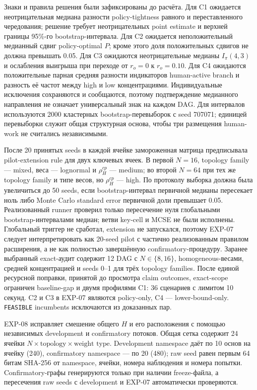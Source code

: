 Знаки и правила решения были зафиксированы до расчёта. Для C1 ожидается
неотрицательная медиана разности policy-tightness равного и переставленного
чередования; решение требует неотрицательных point estimate и верхней границы
95\%-го bootstrap-интервала. Для C2 ожидается неположительный медианный сдвиг
policy-optimal $P$; кроме этого доля положительных сдвигов не должна превышать
0.05. Для C3 ожидаются неотрицательные медианы $I_\pi(4,3)$ и ослабления
выигрыша при переходе от $r_o=0$ к $r_o=0.10$. Для C4 ожидаются положительные
парная средняя разности индикаторов human-active branch и разность её частот
между high и low концентрациями. Индивидуальные исключения сохраняются и
сообщаются, поэтому подтверждение медианного направления не означает
универсальный знак на каждом DAG. Для интервалов используются 2000 кластерных
bootstrap-перевыборок с seed 707071; единицей перевыборки служит общая
структурная основа, чтобы три размещения human-work не считались независимыми.

После 20 принятых seeds в каждой ячейке замороженная матрица предписывала
pilot-extension rule для двух ключевых ячеек. В первой $N=16$, topology
family --- mixed, веса --- lognormal и $\rho_H^{cp}$ --- medium; во второй
$N=64$ при тех же topology family и типе весов, но $\rho_H^{cp}$ --- high.
По протоколу выборка должна была увеличиться до 50 seeds, если
bootstrap-интервал первичной медианы пересекает ноль либо Monte Carlo standard
error первичной доли превышает 0.05. Реализованный runner проверил только
пересечение нуля глобальными bootstrap-интервалами медиан; ветви key-cell и
MCSE не были исполнены. Глобальный триггер не сработал, extension не запускался,
поэтому EXP-07 следует интерпретировать как 20-seed pilot с частично
реализованным правилом расширения, а не как полностью завершённую
confirmatory-процедуру. Заранее выбранный exact-аудит содержит 12 DAG с
$N\in\{8,16\}$, homogeneous-весами, средней концентрацией и seeds 0--1 для
трёх topology families. После единой ресурсной поправки, принятой до просмотра
claim outcomes, exact-scope ограничен baseline-gap и двумя профилями C1: 36
сценариев с лимитом 10 секунд. C2 и C3 в EXP-07 являются policy-only, C4 ---
lower-bound-only. \texttt{FEASIBLE} incumbents исключаются из доказанных пар.

EXP-08 исправляет смешение общего $H$ и его расположения с помощью независимых
development и confirmatory потоков. Общая сетка содержит 24 ячейки
$N\times\text{topology}\times\text{weight type}$. Development namespace даёт
по 10 основ на ячейку (240), confirmatory namespace --- по 20 (480); raw seed
равен первым 64 битам SHA-256 от namespace, ячейки, номера наблюдения и номера
попытки. Confirmatory-графы генерируются только при наличии freeze-файла, а
пересечения raw seeds с development и EXP-07 автоматически проверяются.

